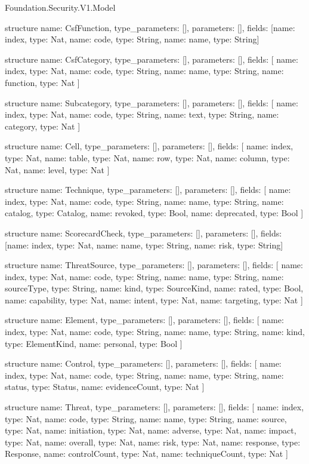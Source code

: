 \begin{lexlean}{Foundation.Security.V1.Model}
\begin{semanticmodule}
structure{
  name: CsfFunction,
  type_parameters: [],
  parameters: [],
  fields: [{name: index, type: Nat}, {name: code, type: String}, {name: name, type: String}]
}

structure{
  name: CsfCategory,
  type_parameters: [],
  parameters: [],
  fields: [
    {name: index, type: Nat},
    {name: code, type: String},
    {name: name, type: String},
    {name: function, type: Nat}
  ]
}

structure{
  name: Subcategory,
  type_parameters: [],
  parameters: [],
  fields: [
    {name: index, type: Nat},
    {name: code, type: String},
    {name: text, type: String},
    {name: category, type: Nat}
  ]
}

structure{
  name: Cell,
  type_parameters: [],
  parameters: [],
  fields: [
    {name: index, type: Nat},
    {name: table, type: Nat},
    {name: row, type: Nat},
    {name: column, type: Nat},
    {name: level, type: Nat}
  ]
}

structure{
  name: Technique,
  type_parameters: [],
  parameters: [],
  fields: [
    {name: index, type: Nat},
    {name: code, type: String},
    {name: name, type: String},
    {name: catalog, type: Catalog},
    {name: revoked, type: Bool},
    {name: deprecated, type: Bool}
  ]
}

structure{
  name: ScorecardCheck,
  type_parameters: [],
  parameters: [],
  fields: [{name: index, type: Nat}, {name: name, type: String}, {name: risk, type: String}]
}

structure{
  name: ThreatSource,
  type_parameters: [],
  parameters: [],
  fields: [
    {name: index, type: Nat},
    {name: code, type: String},
    {name: name, type: String},
    {name: sourceType, type: String},
    {name: kind, type: SourceKind},
    {name: rated, type: Bool},
    {name: capability, type: Nat},
    {name: intent, type: Nat},
    {name: targeting, type: Nat}
  ]
}

structure{
  name: Element,
  type_parameters: [],
  parameters: [],
  fields: [
    {name: index, type: Nat},
    {name: code, type: String},
    {name: name, type: String},
    {name: kind, type: ElementKind},
    {name: personal, type: Bool}
  ]
}

structure{
  name: Control,
  type_parameters: [],
  parameters: [],
  fields: [
    {name: index, type: Nat},
    {name: code, type: String},
    {name: name, type: String},
    {name: status, type: Status},
    {name: evidenceCount, type: Nat}
  ]
}

structure{
  name: Threat,
  type_parameters: [],
  parameters: [],
  fields: [
    {name: index, type: Nat},
    {name: code, type: String},
    {name: name, type: String},
    {name: source, type: Nat},
    {name: initiation, type: Nat},
    {name: adverse, type: Nat},
    {name: impact, type: Nat},
    {name: overall, type: Nat},
    {name: risk, type: Nat},
    {name: response, type: Response},
    {name: controlCount, type: Nat},
    {name: techniqueCount, type: Nat}
  ]
}


\end{semanticmodule}
\end{lexlean}
